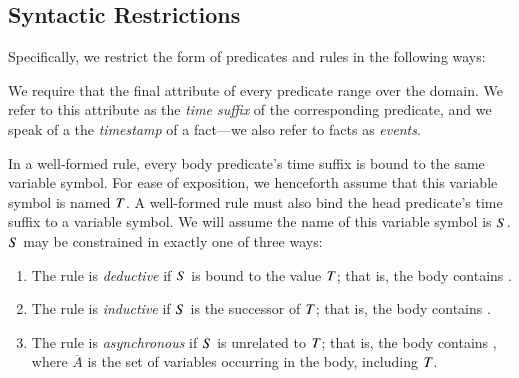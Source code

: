 \subsection{Syntactic Restrictions}
\label{sec:syntaxrestrictions}

Specifically, we restrict the form of predicates and rules in the following ways:

We require that the final attribute of every \lang
predicate range over the  domain.  
We refer to this attribute as the \emph{time suffix} of the corresponding
predicate, and we speak of a the {\em timestamp} of a fact---we also refer to
facts as {\em events}.

%
%
In a well-formed \lang rule, every body predicate's time suffix is bound to the
same variable symbol.  For ease of exposition, we henceforth assume that this
variable symbol is named $\DT$.  A well-formed \lang rule must also bind the
head predicate's time suffix to a variable symbol.  We will assume the name of
this variable symbol is $\DS$.  $\DS$ may be constrained in exactly one of
three ways:

\begin{enumerate}
%
\item The rule is {\em deductive} if $\DS$ is bound to the value
$\DT$; that is, the body contains \dedalus{$\DS$ = $\DT$}.
%
\item The rule is {\em inductive} if $\DS$ is the successor of
$\DT$; that is, the body contains .
%
\item The rule is {\em asynchronous} if $\DS$ is unrelated to $\DT$;
that is, the body contains , where $\overline{A}$ is the set of variables occurring in the body,
including $\DT$.
%
\end{enumerate}

